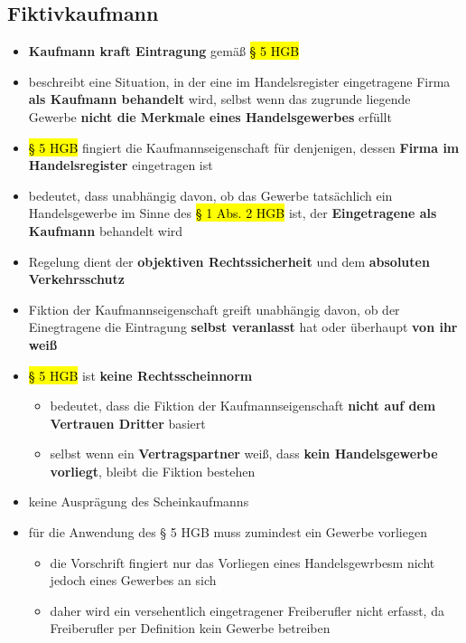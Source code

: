 \documentclass[a4paper, 10pt]{article}
\begin{document}
\subsection{Fiktivkaufmann}
\begin{itemize}
    \item \textbf{Kaufmann kraft Eintragung} gemäß \hl{§ 5 HGB}
    \item beschreibt eine Situation, in der eine im Handelsregister eingetragene Firma \textbf{als Kaufmann behandelt} wird, selbst wenn das zugrunde liegende Gewerbe \textbf{nicht die Merkmale eines Handelsgewerbes} erfüllt
    \item \hl{§ 5 HGB} fingiert die Kaufmannseigenschaft für denjenigen, dessen \textbf{Firma im Handelsregister} eingetragen ist
    \item bedeutet, dass unabhängig davon, ob das Gewerbe tatsächlich ein Handelsgewerbe im Sinne des \hl{§ 1 Abs. 2 HGB} ist, der \textbf{Eingetragene als Kaufmann} behandelt wird
    \item Regelung dient der \textbf{objektiven Rechtssicherheit} und dem \textbf{absoluten Verkehrsschutz}
    \item Fiktion der Kaufmannseigenschaft greift unabhängig davon, ob der Einegtragene die Eintragung \textbf{selbst veranlasst} hat oder überhaupt \textbf{von ihr weiß}
    \item \hl{§ 5 HGB} ist \textbf{keine Rechtsscheinnorm}
    \begin{itemize}
        \item bedeutet, dass die Fiktion der Kaufmannseigenschaft \textbf{nicht auf dem Vertrauen Dritter} basiert 
        \item selbst wenn ein \textbf{Vertragspartner} weiß, dass \textbf{kein Handelsgewerbe vorliegt}, bleibt die Fiktion bestehen 
    \end{itemize}
    \item keine Ausprägung des Scheinkaufmanns
    \item für die Anwendung des § 5 HGB muss zumindest ein Gewerbe vorliegen
    \begin{itemize}
        \item die Vorschrift fingiert nur das Vorliegen eines Handelsgewrbesm nicht jedoch eines Gewerbes an sich
        \item daher wird ein versehentlich eingetragener Freiberufler nicht erfasst, da Freiberufler per Definition kein Gewerbe betreiben
    \end{itemize}
\end{itemize}
\end{document}
